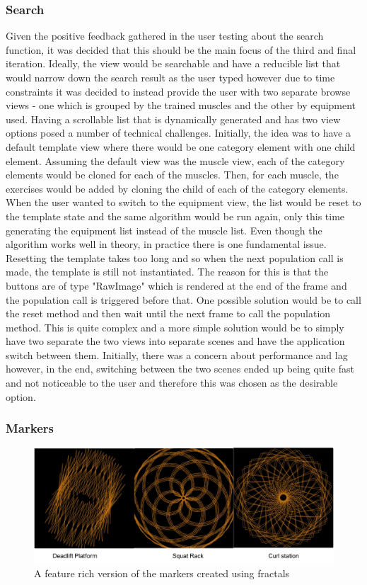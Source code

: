 \documentclass{l4proj}
\begin{document}
\subsubsection{Search}
Given the positive feedback gathered in the user testing about the search function, it was decided that this should be the main focus of the third and final iteration. Ideally, the view would be searchable and have a reducible list that would narrow down the search result as the user typed however due to time constraints it was decided to instead provide the user with two separate browse views - one which is grouped by the trained muscles and the other by equipment used. Having a scrollable list that is dynamically generated and has two view options posed a number of technical challenges. Initially, the idea was to have a default template view where there would be one category element with one child element. Assuming the default view was the muscle view, each of the category elements would be cloned for each of the muscles. Then, for each muscle, the exercises would be added by cloning the child of each of the category elements. When the user wanted to switch to the equipment view, the list would be reset to the template state and the same algorithm would be run again, only this time generating the equipment list instead of the muscle list. Even though the algorithm works well in theory, in practice there is one fundamental issue. Resetting the template takes too long and so when the next population call is made, the template is still not instantiated. The reason for this is that the buttons are of type "RawImage" which is rendered at the end of the frame and the population call is triggered before that. One possible solution would be to call the reset method and then wait until the next frame to call the population method. This is quite complex and a more simple solution would be to simply have two separate the two views into separate scenes and have the application switch between them. Initially, there was a concern about performance and lag however, in the end, switching between the two scenes ended up being quite fast and not noticeable to the user and therefore this was chosen as the desirable option.

\subsubsection{Markers}
\begin{figure}
\centering
\includegraphics[width=\textwidth]{images/fractal_marker.png}
\caption{A feature rich version of the markers created using fractals} 
\label{fig:fractal_marker}
\end{figure}
\end{document}
